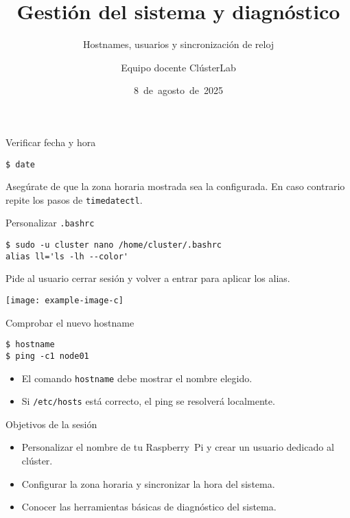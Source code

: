 \documentclass[aspectratio=169,professionalfonts]{beamer}
\title[ClústerLab • Día 3]{Gestión del sistema y diagnóstico}
\subtitle{Hostnames, usuarios y sincronización de reloj}
\author{Equipo docente ClústerLab}
\date{8 de agosto de 2025}
\begin{document}
\begin{frame}[plain]
  \titlepage
\end{frame}

\begin{frame}[fragile]{Verificar fecha y hora}
  \begin{verbatim}
$ date
  \end{verbatim}
  Asegúrate de que la zona horaria mostrada sea la configurada. En caso contrario repite los pasos de \texttt{timedatectl}.
\end{frame}

\begin{frame}[fragile]{Personalizar \texttt{.bashrc}}
  \begin{verbatim}
$ sudo -u cluster nano /home/cluster/.bashrc
alias ll='ls -lh --color'
  \end{verbatim}
  Pide al usuario cerrar sesión y volver a entrar para aplicar los alias.
  \begin{center}
    \texttt{[image: example-image-c]}
  \end{center}
\end{frame}

\begin{frame}[fragile]{Comprobar el nuevo hostname}
  \begin{verbatim}
$ hostname
$ ping -c1 node01
  \end{verbatim}
  \begin{itemize}
    \item El comando \texttt{hostname} debe mostrar el nombre elegido.
    \item Si \texttt{/etc/hosts} está correcto, el ping se resolverá localmente.
  \end{itemize}
\end{frame}

\begin{frame}[fragile]{Objetivos de la sesión}
  \begin{itemize}
    \item Personalizar el nombre de tu Raspberry Pi y crear un usuario dedicado al clúster.
    \item Configurar la zona horaria y sincronizar la hora del sistema.
    \item Conocer las herramientas básicas de diagnóstico del sistema.
  \end{itemize}
\end{frame}
\end{document}
